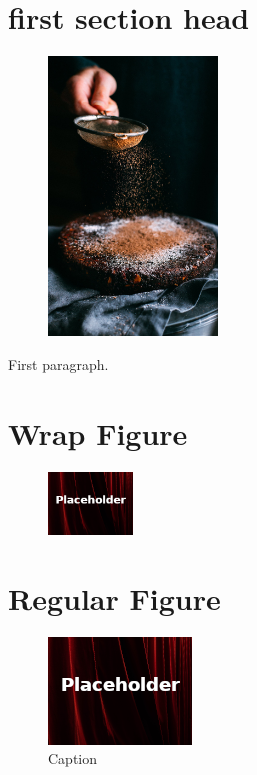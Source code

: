 \section{first section head}

\begin{figure}
	\centering
	\includegraphics[width=0.4\textwidth]{gfx/05-cake} 
\end{figure}

First paragraph.

\section{Wrap Figure}
\begin{figure}
	\caption{} %
	\label{03:fig02} 
	\centering
	\includegraphics[width=0.2\textwidth]{gfx/99-placeholder} 
\end{figure}

\section{Regular Figure}
\begin{figure}[H]
	\centering
	\includegraphics[width=\maxwidth{.95\linewidth}]{gfx/99-placeholder}
	\caption{Caption}
	\label{03:fig03}
\end{figure}

